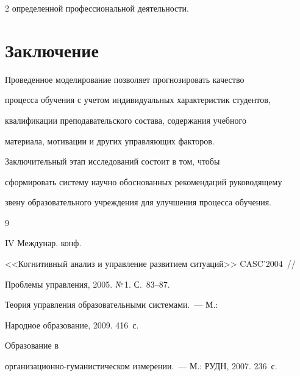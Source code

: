 \begin{multicols}{2}
определенной профессиональной деятельности.


     


     \section{Заключение}


     


     Проведенное моделирование позволяет прогнозировать качество 


процесса обучения с учетом индивидуальных характеристик студентов, 


квалификации преподавательского состава, содержания учебного 


материала, мотивации и других управляющих факторов. 


     


     Заключительный этап исследований состоит в том, чтобы 


сформировать систему научно обоснованных рекомендаций руководящему 


звену образовательного учреждения для улучшения процесса обучения.





     


{\small\frenchspacing


{%




\begin{thebibliography}{9}




 IV Междунар. конф. 


<<Когнитивный анализ и управление развитием ситуаций>> CASC'2004~// 


Проблемы управления, 2005. №\,1. С.~83--87.




 Теория управления образовательными системами.~--- М.: 


Народное образование, 2009. 416~с. 




 Образование в 


ор\-га\-ни\-за\-ци\-он\-но-гу\-ма\-ни\-сти\-че\-ском измерении.~--- М.: РУДН, 2007. 236~с.



\end{thebibliography}}}
\end{multicols}
